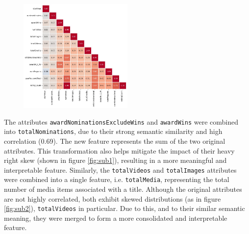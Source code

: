 \begin{figure}[H]
    \centering
    \includegraphics[width=0.50\textwidth]{plots/correlation_matrix.png}
    \label{fig:correlation_matrix}
\end{figure}

The attributes \texttt{awardNominationsExcludeWins} and \texttt{awardWins} were combined into 
\texttt{totalNominations}, due to their strong semantic similarity and high correlation (0.69).
The new feature represents the sum of the two original attributes. This transformation also helps
mitigate the impact of their heavy right skew (shown in figure \ref{fig:sub1}), resulting in a more meaningful and interpretable feature.
Similarly, the \texttt{totalVideos} and \texttt{totalImages} attributes were combined into a single
feature, i.e. \texttt{totalMedia}, representing the total number of media items associated with a title.
Although the original attributes are not highly correlated, both exhibit skewed distributions (as in figure \ref{fig:sub2}), \texttt{totalVideos} in particular.
Due to this, and to their similar semantic meaning, they were merged to form a more consolidated and
interpretable feature.

